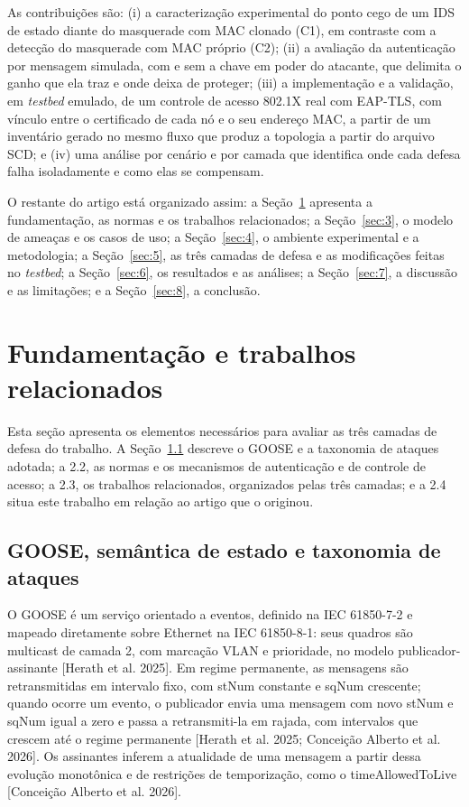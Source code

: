 \documentclass[12pt]{article}
\newcommand{\cit}[2]{[#1]\nocite{#2}}
\begin{document}
As contribuições são: (i) a caracterização experimental do ponto cego de um IDS de estado diante do masquerade com MAC clonado (C1), em contraste com a detecção do masquerade com MAC próprio (C2); (ii) a avaliação da autenticação por mensagem simulada, com e sem a chave em poder do atacante, que delimita o ganho que ela traz e onde deixa de proteger; (iii) a implementação e a validação, em \emph{testbed} emulado, de um controle de acesso 802.1X real com EAP-TLS, com vínculo entre o certificado de cada nó e o seu endereço MAC, a partir de um inventário gerado no mesmo fluxo que produz a topologia a partir do arquivo SCD; e (iv) uma análise por cenário e por camada que identifica onde cada defesa falha isoladamente e como elas se compensam.

O restante do artigo está organizado assim: a Seção~\ref{sec:2} apresenta a fundamentação, as normas e os trabalhos relacionados; a Seção~\ref{sec:3}, o modelo de ameaças e os casos de uso; a Seção~\ref{sec:4}, o ambiente experimental e a metodologia; a Seção~\ref{sec:5}, as três camadas de defesa e as modificações feitas no \emph{testbed}; a Seção~\ref{sec:6}, os resultados e as análises; a Seção~\ref{sec:7}, a discussão e as limitações; e a Seção~\ref{sec:8}, a conclusão.

\section{Fundamentação e trabalhos relacionados}\label{sec:2}

Esta seção apresenta os elementos necessários para avaliar as três camadas de defesa do trabalho. A Seção~\ref{sec:2.1} descreve o GOOSE e a taxonomia de ataques adotada; a 2.2, as normas e os mecanismos de autenticação e de controle de acesso; a 2.3, os trabalhos relacionados, organizados pelas três camadas; e a 2.4 situa este trabalho em relação ao artigo que o originou.

\subsection{GOOSE, semântica de estado e taxonomia de ataques}\label{sec:2.1}

O GOOSE é um serviço orientado a eventos, definido na IEC 61850-7-2 e mapeado diretamente sobre Ethernet na IEC 61850-8-1: seus quadros são multicast de camada 2, com marcação VLAN e prioridade, no modelo publicador-assinante \cit{Herath et al. 2025}{herath2025evaluation}. Em regime permanente, as mensagens são retransmitidas em intervalo fixo, com stNum constante e sqNum crescente; quando ocorre um evento, o publicador envia uma mensagem com novo stNum e sqNum igual a zero e passa a retransmiti-la em rajada, com intervalos que crescem até o regime permanente \cit{Herath et al. 2025; Conceição Alberto et al. 2026}{herath2025evaluation,alberto2026gooseidrs}. Os assinantes inferem a atualidade de uma mensagem a partir dessa evolução monotônica e de restrições de temporização, como o timeAllowedToLive \cit{Conceição Alberto et al. 2026}{alberto2026gooseidrs}.
\end{document}
